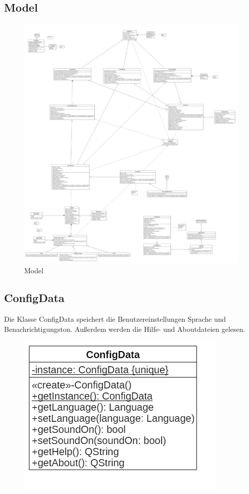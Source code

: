 \subsection{Model}

\begin{figure}[H]
\includegraphics[width=1\linewidth]{img/Klassendiagramm/Model}
\caption{Model}
\label{fig:model}
\end{figure}


\subsection*{ConfigData}

Die Klasse ConfigData speichert die Benutzereinstellungen Sprache und Benachrichtigungston. Außerdem werden die Hilfe- und Aboutdateien gelesen.

\begin{figure}[H]
\centering
\includegraphics[scale=0.5]{img/Klassendiagramm/Klassen/Model/ConfigData}
\label{fig:configData}
\end{figure}

